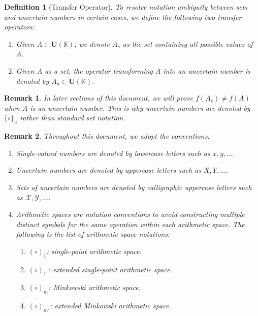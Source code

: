 \documentclass[a4paper,12pt, twoside]{memoir}
\newtheorem{definition}{Definition}[chapter]
\newtheorem{remark}{Remark}[chapter]
\newcommand{\tsbd}[1]{\mathbf{U}(\mathbb{#1})}
\newcommand{\kgdd}[1]{\left(#1\right)_1} %
\newcommand{\kgddmr}[1]{\left(#1\right)_{1'}} %
\newcommand{\kgdt}[1]{\left(#1\right)_m} %
\newcommand{\kgdtmr}[1]{\left(#1\right)_{m'}} %
\begin{document}
\begin{definition}[Transfer Operator]
	To resolve notation ambiguity between sets and uncertain numbers in certain cases, we define the following two transfer operators:
	\begin{enumerate}[leftmargin=*]
		\item Given $A \in \tsbd{K}$, we denote $A_s$ as the set containing all possible values of $A$.
		\item Given $A$ as a set, the operator transforming $A$ into an uncertain number is denoted by $A_u \in \tsbd{K}$.
	\end{enumerate}
\end{definition}

\begin{remark}
	In later sections of this document, we will prove $f(A_s) \neq f(A)$ when $A$ is an uncertain number. This is why uncertain numbers are denoted by $\{\circ\}_u$ rather than standard set notation.
\end{remark}

\begin{remark}
	Throughout this document, we adopt the conventions:
	\begin{enumerate}[leftmargin=*]
		\item Single-valued numbers are denoted by lowercase letters such as $x, y, \dots$.
		\item Uncertain numbers are denoted by uppercase letters such as $X, Y, \dots$.
		\item Sets of uncertain numbers are denoted by calligraphic uppercase letters such as $\mathcal{X}, \mathcal{Y}, \dots$.
		\item Arithmetic spaces are notation conventions to avoid constructing multiple distinct symbols for the same operation within each arithmetic space. The following is the list of arithmetic space notations:
		      \begin{enumerate}[leftmargin=*]
			      \item $\kgdd{\circ}$: single-point arithmetic space.
			      \item $\kgddmr{\circ}$: extended single-point arithmetic space.
			      \item $\kgdt{\circ}$: Minkowski arithmetic space.
			      \item $\kgdtmr{\circ}$: extended Minkowski arithmetic space.
		      \end{enumerate}
	\end{enumerate}
\end{remark}
\end{document}
